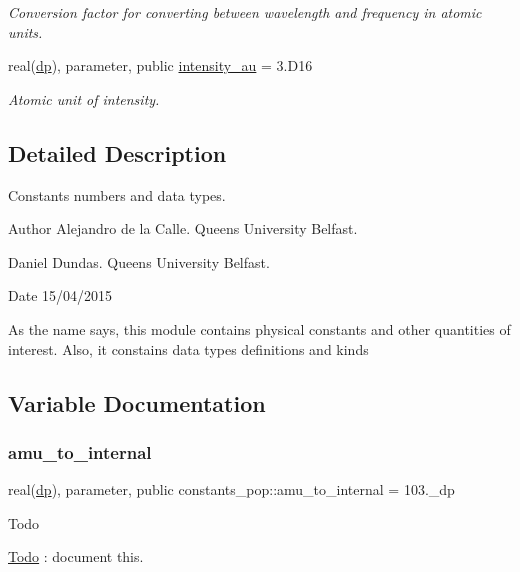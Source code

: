 \begin{DoxyCompactItemize}
$$\begin{DoxyCompactList}\small\item\em Conversion factor for converting between wavelength and frequency in atomic units. \end{DoxyCompactList}\item 
\mbox{\label{namespaceconstants__pop_a9c3733d86ce09fbf90cd8d74ea3c5419}} 
real(\mbox{\hyperlink{namespaceconstants__pop_aa40e688cf9ef9b7cf0db05c80879ca15}{dp}}), parameter, public \mbox{\hyperlink{namespaceconstants__pop_a9c3733d86ce09fbf90cd8d74ea3c5419}{intensity\+\_\+au}} = 3.\+D16
\begin{DoxyCompactList}\small\item\em Atomic unit of intensity. \end{DoxyCompactList}\end{DoxyCompactItemize}


\subsection{Detailed Description}
Constants numbers and data types. 

\begin{DoxyAuthor}{Author}
Alejandro de la Calle. Queen\textquotesingle{}s University Belfast. 

Daniel Dundas. Queen\textquotesingle{}s University Belfast. 
\end{DoxyAuthor}
\begin{DoxyDate}{Date}
15/04/2015
\end{DoxyDate}
As the name says, this module contains physical constants and other quantities of interest. Also, it constains data types definitions and kinds 

\subsection{Variable Documentation}
\mbox{\label{namespaceconstants__pop_a65af0ef41eb6207bbb00ff634e46aead}} 
\subsubsection{\texorpdfstring{amu\+\_\+to\+\_\+internal}{amu\_to\_internal}}
{\footnotesize\ttfamily real(\mbox{\hyperlink{namespaceconstants__pop_aa40e688cf9ef9b7cf0db05c80879ca15}{dp}}), parameter, public constants\+\_\+pop\+::amu\+\_\+to\+\_\+internal = 103.\+\_\+dp}

\begin{DoxyRefDesc}{Todo}
\item[\mbox{\hyperlink{todo__todo000001}{Todo}}]\+: document this. \end{DoxyRefDesc}
